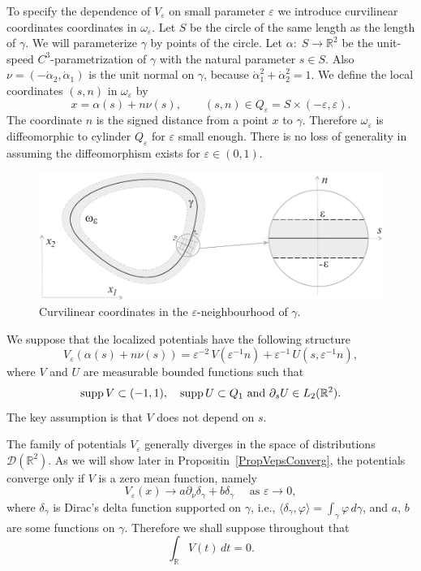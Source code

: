 \documentclass[graybox]{svmult}
\newcommand{\supp}{\mathop{\rm supp}}
\newcommand{\Real}{\mathbb R}
\newcommand{\eps}{\varepsilon}
\renewcommand{\phi}{\varphi}
\begin{document}
To specify  the dependence of $V_\eps$ on  small parameter $\eps$ we introduce  curvilinear coordinates coordinates in $\omega_\eps$.
Let $S$ be the circle of the same length as the length of $\gamma$.
We will parameterize $\gamma$ by points of the circle.
Let $\alpha\colon\; S\to \Real^2$ be the unit-speed $C^3$-parametrization of $\gamma$ with the natural parameter $s\in S$.
Also  $\nu=(-\dot{\alpha}_2, \dot{\alpha}_1)$ is the unit normal on $\gamma$, because  $\dot{\alpha}_1^2+\dot{\alpha}_2^2=1$.
We define the local coordinates $(s,n)$ in $\omega_\eps$ by
\begin{equation}\label{LocalTr}
    x=\alpha(s)+n\nu(s), \qquad (s,n)\in Q_\eps=S\times (-\eps, \eps).
\end{equation}
The coordinate $n$ is the signed distance from a point $x$ to $\gamma$.
Therefore  $\omega_\eps$ is diffeomorphic to cylinder $Q_\eps$ for $\eps$ small enough. There is no loss of generality in assuming the diffeomorphism exists for $\eps\in (0,1)$.

\begin{figure}[b]
\centering
\includegraphics[scale=.6]{LocalCoords}
\caption{Curvilinear coordinates in the $\eps$-neighbourhood of $\gamma$.}
\label{FigLocalCoords}
\end{figure}


We suppose that the localized potentials have the following structure
\begin{equation}\label{Veps}
V_\eps(\alpha(s)+n\nu(s))=\eps^{-2}\,V\left(\eps^{-1}n\right)
+\eps^{-1}\,U\left(s,\eps^{-1}n\right),
\end{equation}
where $V$ and $U$ are measurable bounded functions such that
\begin{equation}\label{pdsU}
\supp V\subset (-1,1), \quad \supp U\subset Q_1 \mbox{ and }\partial_s U\in L_2(\Real^2).
\end{equation}
 The key assumption is that $V$ does not depend on  $s$.

The family of potentials $V_\eps$ generally diverges in the space of distributions $\mathcal{D}(\Real^2)$.
As we will show later in Propositin~\ref{PropVepsConverg},
the  potentials converge only if $V$ is a zero mean function, namely
$$
   V_\eps(x)\to a \partial_\nu\delta_\gamma+b\delta_\gamma\quad \mbox{ as \ }\eps\to 0,
$$
where $\delta_\gamma$ is Dirac's delta function supported on $\gamma$, i.e., $\langle\delta_\gamma, \phi\rangle=\int_\gamma \phi \,d \gamma$,  and $a$, $b$ are some functions on $\gamma$. Therefore we shall suppose throughout that
\begin{equation}\label{Vzeromean}
  \int_\Real V(t)\,dt=0.
\end{equation}
\end{document}
